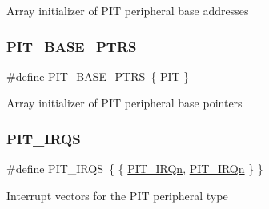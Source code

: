 Array initializer of P\+IT peripheral base addresses \mbox{\label{group___p_i_t___peripheral___access___layer_ga403e0ed71b80cfe3e085fe6b56b5eff0}} 
\subsubsection{\texorpdfstring{PIT\_BASE\_PTRS}{PIT\_BASE\_PTRS}}
{\footnotesize\ttfamily \#define P\+I\+T\+\_\+\+B\+A\+S\+E\+\_\+\+P\+T\+RS~\{ \mbox{\hyperlink{group___p_i_t___peripheral___access___layer_gaf181c9e6602b6432a0bf1a9243808968}{P\+IT}} \}}

Array initializer of P\+IT peripheral base pointers \mbox{\label{group___p_i_t___peripheral___access___layer_ga5f0ae6317a2c8c12e46e49c6e2e29dda}} 
\subsubsection{\texorpdfstring{PIT\_IRQS}{PIT\_IRQS}}
{\footnotesize\ttfamily \#define P\+I\+T\+\_\+\+I\+R\+QS~\{ \{ \mbox{\hyperlink{group___interrupt__vector__numbers_gga666eb0caeb12ec0e281415592ae89083abbb108c2729a964669d647df5c52b357}{P\+I\+T\+\_\+\+I\+R\+Qn}}, \mbox{\hyperlink{group___interrupt__vector__numbers_gga666eb0caeb12ec0e281415592ae89083abbb108c2729a964669d647df5c52b357}{P\+I\+T\+\_\+\+I\+R\+Qn}} \} \}}

Interrupt vectors for the P\+IT peripheral type 